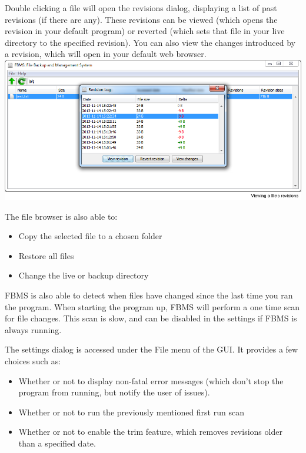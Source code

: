 \documentclass[12pt,a4paper]{article}
\begin{document}
Double clicking a file will open the revisions dialog, displaying a list of past revisions (if there are any). These revisions can be viewed (which opens the revision in your default program) or reverted (which sets that file in your live directory to the specified revision). You can also view the changes introduced by a revision, which will open in your default web browser. \\

\includegraphics[width=\textwidth]{images/6-revisionDialog.png}

The file browser is also able to:

\begin{itemize}
\item Copy the selected file to a chosen folder
\item Restore all files
\item Change the live or backup directory
\end{itemize}

FBMS is also able to detect when files have changed since the last time you ran the program. When starting the program up, FBMS will perform a one time scan for file changes. This scan is slow, and can be disabled in the settings if FBMS is always running.

The settings dialog is accessed under the File menu of the GUI. It provides a few choices such as:

\begin{itemize}
\item Whether or not to display non-fatal error messages (which don't stop the program from running, but notify the user of issues).
\item Whether or not to run the previously mentioned first run scan
\item Whether or not to enable the trim feature, which removes revisions older than a specified date.
\end{itemize}
\end{document}
